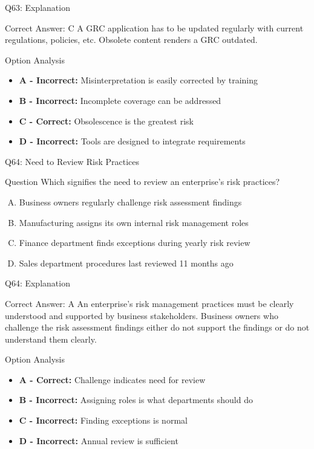 \documentclass{beamer}
\begin{document}
	\begin{frame}{Q63: Explanation}
		\begin{block}{Correct Answer: C}
			A GRC application has to be updated regularly with current regulations, policies, etc. Obsolete content renders a GRC outdated.
		\end{block}
		\begin{block}{Option Analysis}
			\begin{itemize}
				\item \textbf{A - Incorrect:} Misinterpretation is easily corrected by training
				\item \textbf{B - Incorrect:} Incomplete coverage can be addressed
				\item \textbf{C - Correct:} Obsolescence is the greatest risk
				\item \textbf{D - Incorrect:} Tools are designed to integrate requirements
			\end{itemize}
		\end{block}
	\end{frame}
	
	\begin{frame}{Q64: Need to Review Risk Practices}
		\begin{block}{Question}
			Which signifies the need to review an enterprise's risk practices?
		\end{block}
		\begin{enumerate}[(A)]
			\item Business owners regularly challenge risk assessment findings
			\item Manufacturing assigns its own internal risk management roles
			\item Finance department finds exceptions during yearly risk review
			\item Sales department procedures last reviewed 11 months ago
		\end{enumerate}
	\end{frame}
	
	\begin{frame}{Q64: Explanation}
		\begin{block}{Correct Answer: A}
			An enterprise's risk management practices must be clearly understood and supported by business stakeholders. Business owners who challenge the risk assessment findings either do not support the findings or do not understand them clearly.
		\end{block}
		\begin{block}{Option Analysis}
			\begin{itemize}
				\item \textbf{A - Correct:} Challenge indicates need for review
				\item \textbf{B - Incorrect:} Assigning roles is what departments should do
				\item \textbf{C - Incorrect:} Finding exceptions is normal
				\item \textbf{D - Incorrect:} Annual review is sufficient
			\end{itemize}
		\end{block}
	\end{frame}
	
\end{document}
